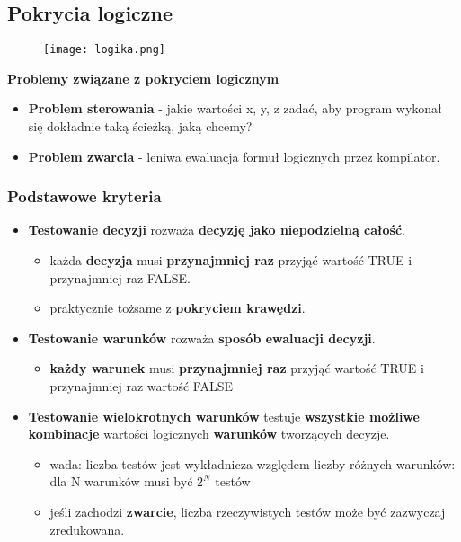 \documentclass[../main.tex]{subfiles}
\begin{document}
    \subsection{Pokrycia logiczne}

    \begin{figure}[H]
        \texttt{[image: logika.png]}
    \end{figure}

    \textbf{Problemy związane z pokryciem logicznym}
    \begin{itemize}
        \item \textbf{Problem sterowania} - jakie wartości x, y, z zadać, aby program wykonał się dokładnie taką ścieżką,
        jaką chcemy?

        \item \textbf{Problem zwarcia} - leniwa ewaluacja formuł logicznych przez kompilator.
    \end{itemize}
    \subsubsection{Podstawowe kryteria}

    \begin{itemize}
        \item \textbf{Testowanie decyzji} rozważa \textbf{decyzję jako niepodzielną całość}.
        \begin{itemize}
            \item każda \textbf{decyzja} musi \textbf{przynajmniej raz} przyjąć wartość TRUE i przynajmniej raz FALSE.
            \item praktycznie tożsame z \textbf{pokryciem krawędzi}.
        \end{itemize}

        \item \textbf{Testowanie warunków} rozważa \textbf{sposób ewaluacji decyzji}.
        \begin{itemize}
            \item \textbf{każdy warunek} musi \textbf{przynajmniej raz} przyjąć wartość TRUE i przynajmniej raz wartość FALSE
        \end{itemize}

        \item \textbf{Testowanie wielokrotnych warunków} testuje \textbf{wszystkie możliwe kombinacje} wartości
        logicznych \textbf{warunków} tworzących decyzje.
        \begin{itemize}
            \item wada: liczba testów jest wykładnicza względem liczby różnych
            warunków: dla N warunków musi być $2^N$ testów
            \item jeśli zachodzi \textbf{zwarcie}, liczba rzeczywistych testów może być zazwyczaj zredukowana.

        \end{itemize}
    \end{itemize}
\end{document}
